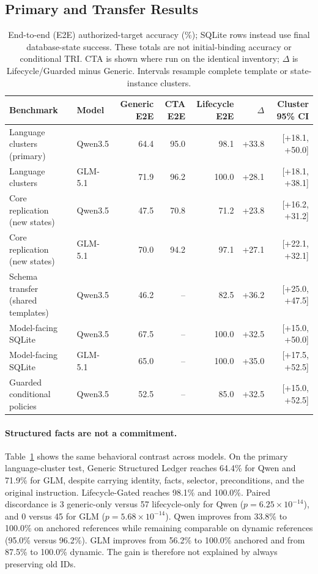 \documentclass[letterpaper]{article}
\begin{document}
\subsection{Primary and Transfer Results}

\begin{table}[t]
\centering
\small
\begin{tabular}{llrrrrr}
\toprule
Benchmark & Model & Generic E2E & CTA E2E & Lifecycle E2E & $\Delta$ & Cluster 95\% CI \\
\midrule
Language clusters (primary) & Qwen3.5 & 64.4 & 95.0 & 98.1 & +33.8 & [+18.1, +50.0] \\
Language clusters & GLM-5.1 & 71.9 & 96.2 & 100.0 & +28.1 & [+18.1, +38.1] \\
Core replication (new states) & Qwen3.5 & 47.5 & 70.8 & 71.2 & +23.8 & [+16.2, +31.2] \\
Core replication (new states) & GLM-5.1 & 70.0 & 94.2 & 97.1 & +27.1 & [+22.1, +32.1] \\
Schema transfer (shared templates) & Qwen3.5 & 46.2 & -- & 82.5 & +36.2 & [+25.0, +47.5] \\
Model-facing SQLite & Qwen3.5 & 67.5 & -- & 100.0 & +32.5 & [+15.0, +50.0] \\
Model-facing SQLite & GLM-5.1 & 65.0 & -- & 100.0 & +35.0 & [+17.5, +52.5] \\
Guarded conditional policies & Qwen3.5 & 52.5 & -- & 85.0 & +32.5 & [+15.0, +52.5] \\
\bottomrule
\end{tabular}
\caption{End-to-end (E2E) authorized-target accuracy (\%); SQLite rows instead use final
database-state success. These totals are not initial-binding accuracy or conditional TRI.
CTA is shown where run on the identical inventory; $\Delta$ is Lifecycle/Guarded minus Generic.
Intervals resample complete template or state-instance clusters.}
\label{tab:main}
\end{table}

\paragraph{Structured facts are not a commitment.}
Table~\ref{tab:main} shows the same behavioral contrast across models.
On the primary language-cluster test, Generic Structured Ledger reaches 64.4\% for Qwen and
71.9\% for GLM, despite carrying identity, facts, selector, preconditions, and the original
instruction. Lifecycle-Gated reaches 98.1\% and 100.0\%. Paired discordance is 3 generic-only
versus 57 lifecycle-only for Qwen ($p=6.25\times10^{-14}$), and 0 versus 45 for GLM
($p=5.68\times10^{-14}$). Qwen improves from 33.8\% to 100.0\% on anchored references while
remaining comparable on dynamic references (95.0\% versus 96.2\%). GLM improves from 56.2\%
to 100.0\% anchored and from 87.5\% to 100.0\% dynamic. The gain is therefore not explained by
always preserving old IDs.
\end{document}
